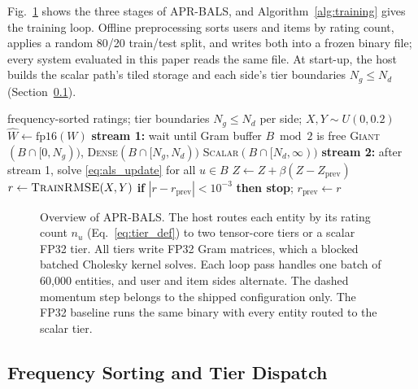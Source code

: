 Fig.~\ref{fig:framework} shows the three stages of APR-BALS, and Algorithm~\ref{alg:training} gives the training loop. Offline preprocessing sorts users and items by rating count, applies a random 80/20 train/test split, and writes both into a frozen binary file; every system evaluated in this paper reads the same file. At start-up, the host builds the scalar path's tiled storage and each side's tier boundaries $N_g \le N_d$ (Section~\ref{ssec:dispatch}).

\begin{algorithm}[!t]
\caption{APR-BALS training loop (host side)}
\label{alg:training}
\small
\begin{algorithmic}[1]
\REQUIRE frequency-sorted ratings; tier boundaries $N_g \le N_d$ per side; $X, Y \sim U(0, 0.2)$
    \STATE $\widehat{W} \gets \mathrm{fp16}(W)$ 
      \STATE \textbf{stream 1:} wait until Gram buffer $B \bmod 2$ is free \label{alg:tr:wait}
      \STATE \quad \textsc{Giant}$(B \cap [0, N_g))$, \textsc{Dense}$(B \cap [N_g, N_d))$
      \STATE \quad \textsc{Scalar}$(B \cap [N_d, \infty))$ 
      \STATE \textbf{stream 2:} after stream 1, solve \eqref{eq:als_update} for all $u \in B$ \label{alg:tr:solve}
    \ENDFOR
    \STATE $Z \gets Z + \beta (Z - Z_{\text{prev}})$ 
  \ENDFOR
    \STATE $r \gets \textsc{TrainRMSE}(X, Y)$
    \STATE \textbf{if} $|r - r_{\text{prev}}| < 10^{-3}$ \textbf{then stop}; $r_{\text{prev}} \gets r$
  \ENDIF
\ENDFOR
\end{algorithmic}
\end{algorithm}

\begin{figure}[!t]
\centering

\caption{Overview of APR-BALS. The host routes each entity by its rating count $n_u$ (Eq.~\ref{eq:tier_def}) to two tensor-core tiers or a scalar FP32 tier. All tiers write FP32 Gram matrices, which a blocked batched Cholesky kernel solves. Each loop pass handles one batch of 60{,}000 entities, and user and item sides alternate. The dashed momentum step belongs to the shipped configuration only. The FP32 baseline runs the same binary with every entity routed to the scalar tier.}
\label{fig:framework}
\end{figure}

\subsection{Frequency Sorting and Tier Dispatch}
\label{ssec:dispatch}

